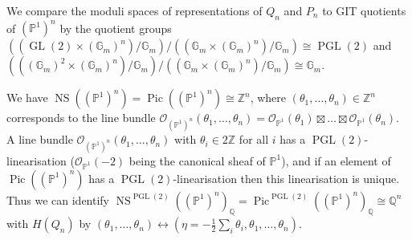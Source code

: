 \documentclass[ALCO,ThmDefs,Unicode,epreuves]{cedram}
\def\Z{\mathds Z}
\def\Q{\mathds Q}
\def\G{\mathds G}
\def\P{\mathds P}
\def\O{\mathcal O}
\DeclareMathOperator{\GL}{GL}
\DeclareMathOperator{\PGL}{PGL}
\DeclareMathOperator{\Pic}{Pic}
\DeclareMathOperator{\NS}{NS}
\begin{document}
We compare the moduli spaces of representations of $Q_n$ and $P_n$ to GIT quotients 
of $(\P^1)^n$ by the quotient groups 
$((\GL(2)\times(\G_m)^n)/\G_m)/((\G_m\times(\G_m)^n)/\G_m)\cong\PGL(2)$ and
$(((\G_m)^2\times(\G_m)^n)/\G_m)/((\G_m\times(\G_m)^n)/\G_m)\cong\G_m$.


We have $\NS((\P^1)^n)=\Pic((\P^1)^n)\cong\Z^n$, where 
$(\theta_1,\ldots,\theta_n)\in\Z^n$ corresponds to the line bundle 
$\O_{(\P^1)^n}(\theta_1,\ldots,\theta_n)=\O_{\P^1}(\theta_1)\boxtimes\ldots\boxtimes
\O_{\P^1}(\theta_n)$. A line bundle 
$\O_{(\P^1)^n}(\theta_1,\ldots,\theta_n)$ with 
$\theta_i\in 2\Z$ for all $i$ has a $\PGL(2)$-linearisation ($\O_{\P^1}(-2)$
being the canonical sheaf of $\P^1$), and if an element of $\Pic((\P^1)^n)$ has a 
$\PGL(2)$-linearisation then this linearisation is unique. Thus we can identify 
$\NS^{\PGL(2)}((\P^1)^n)_\Q=\Pic^{\PGL(2)}((\P^1)^n)_\Q\cong\Q^n$ 
with $H(Q_n)$ by 
$(\theta_1,\ldots,\theta_n)\leftrightarrow(\eta=-\frac{1}{2}\sum_i\theta_i,\theta_1,
\ldots,\theta_n)$.
\end{document}
